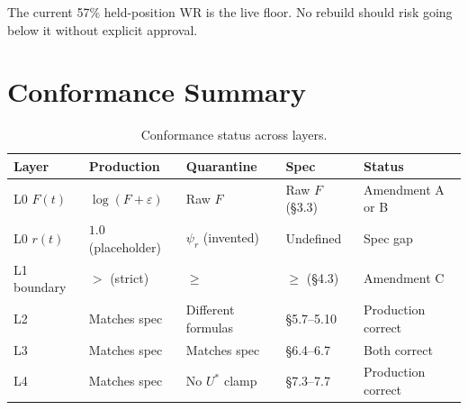\documentclass[11pt,a4paper]{article}
\begin{document}
The current 57\% held-position WR is the live floor. No rebuild should risk
going below it without explicit approval.

\section{Conformance Summary}
\label{sec:conformance}

\begin{table}[h]
\centering
\begin{tabular}{@{}lllll@{}}
\toprule
\textbf{Layer} & \textbf{Production} & \textbf{Quarantine} & \textbf{Spec} & \textbf{Status} \\
\midrule
L0 $F(t)$ & $\log(F + \varepsilon)$ & Raw $F$ & Raw $F$ (\S3.3) & Amendment A or B \\
L0 $r(t)$ & $1.0$ (placeholder) & $\psi_r$ (invented) & Undefined & Spec gap \\
L1 boundary & $>$ (strict) & $\geq$ & $\geq$ (\S4.3) & Amendment C \\
L2 & Matches spec & Different formulas & \S5.7--5.10 & Production correct \\
L3 & Matches spec & Matches spec & \S6.4--6.7 & Both correct \\
L4 & Matches spec & No $U^*$ clamp & \S7.3--7.7 & Production correct \\
\bottomrule
\end{tabular}
\caption{Conformance status across layers.}
\end{table}
\end{document}
